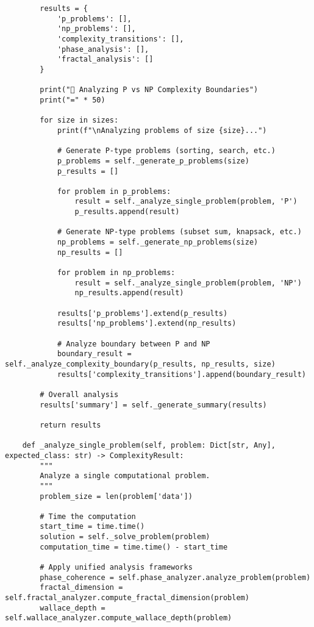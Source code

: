 \documentclass[12pt]{article}
\begin{document}
\begin{lstlisting}
        results = {
            'p_problems': [],
            'np_problems': [],
            'complexity_transitions': [],
            'phase_analysis': [],
            'fractal_analysis': []
        }

        print("🔬 Analyzing P vs NP Complexity Boundaries")
        print("=" * 50)

        for size in sizes:
            print(f"\nAnalyzing problems of size {size}...")

            # Generate P-type problems (sorting, search, etc.)
            p_problems = self._generate_p_problems(size)
            p_results = []

            for problem in p_problems:
                result = self._analyze_single_problem(problem, 'P')
                p_results.append(result)

            # Generate NP-type problems (subset sum, knapsack, etc.)
            np_problems = self._generate_np_problems(size)
            np_results = []

            for problem in np_problems:
                result = self._analyze_single_problem(problem, 'NP')
                np_results.append(result)

            results['p_problems'].extend(p_results)
            results['np_problems'].extend(np_results)

            # Analyze boundary between P and NP
            boundary_result = self._analyze_complexity_boundary(p_results, np_results, size)
            results['complexity_transitions'].append(boundary_result)

        # Overall analysis
        results['summary'] = self._generate_summary(results)

        return results

    def _analyze_single_problem(self, problem: Dict[str, Any], expected_class: str) -> ComplexityResult:
        """
        Analyze a single computational problem.
        """
        problem_size = len(problem['data'])

        # Time the computation
        start_time = time.time()
        solution = self._solve_problem(problem)
        computation_time = time.time() - start_time

        # Apply unified analysis frameworks
        phase_coherence = self.phase_analyzer.analyze_problem(problem)
        fractal_dimension = self.fractal_analyzer.compute_fractal_dimension(problem)
        wallace_depth = self.wallace_analyzer.compute_wallace_depth(problem)


\end{lstlisting}
\end{document}
